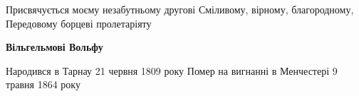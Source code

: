\thispagestyle{empty}
\null\vspace{6cm}

\noindent\hspace{1.5cm}
\begin{minipage}{\linewidth-1.5cm}
\scmain 
\raggedright
Присвячується моєму незабутньому другові\newline
Сміливому, вірному, благородному,\newline
Передовому борцеві пролетаріяту

\smallskip
{\Large\bfseries\scsans Вільгельмові Вольфу}

\smallskip
Народився в Тарнау 21 червня 1809 року\newline
Помер на вигнанні в Менчестері 9 травня 1864 року
\end{minipage}

\cleardoublepage